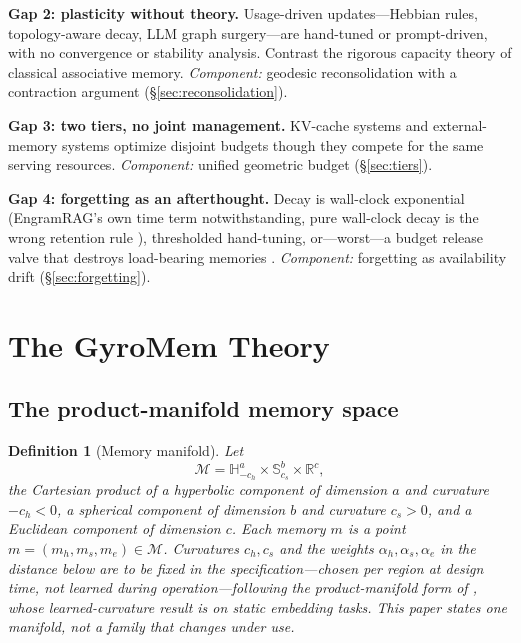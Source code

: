 \documentclass[11pt,a4paper]{article}
\newtheorem{definition}{Definition}
\newcommand{\M}{\mathcal{M}}
\newcommand{\R}{\mathbb{R}}
\newcommand{\Hyp}{\mathbb{H}}
\newcommand{\Sph}{\mathbb{S}}
\begin{document}
\textbf{Gap 2: plasticity without theory.} Usage-driven updates---Hebbian
rules, topology-aware decay, LLM graph surgery---are hand-tuned or
prompt-driven, with no convergence or stability analysis. Contrast the
rigorous capacity theory of classical associative memory. \emph{Component:}
geodesic reconsolidation with a contraction argument (\S\ref{sec:reconsolidation}).

\textbf{Gap 3: two tiers, no joint management.} KV-cache systems
\cite{actkv,agentkv} and external-memory systems \cite{jevmem,realm,jam}
optimize disjoint budgets though they compete for the same serving
resources. \emph{Component:} unified geometric budget (\S\ref{sec:tiers}).

\textbf{Gap 4: forgetting as an afterthought.} Decay is wall-clock
exponential (EngramRAG's own time term notwithstanding, pure wall-clock
decay is the wrong retention rule \cite{engramrag}), thresholded
hand-tuning, or---worst---a budget release valve that destroys load-bearing
memories \cite{epistemics}. \emph{Component:} forgetting as availability
drift (\S\ref{sec:forgetting}).

\section{The GyroMem Theory}

\subsection{The product-manifold memory space}
\label{sec:manifold}

\begin{definition}[Memory manifold]
Let
\begin{equation}
\M = \Hyp^{a}_{-c_h} \times \Sph^{b}_{c_s} \times \R^{c},
\end{equation}
the Cartesian product of a hyperbolic component of dimension $a$ and
curvature $-c_h < 0$, a spherical component of dimension $b$ and curvature
$c_s > 0$, and a Euclidean component of dimension $c$. Each memory $m$ is a
point $m = (m_h, m_s, m_e) \in \M$. Curvatures $c_h, c_s$ and the weights
$\alpha_h, \alpha_s, \alpha_e$ in the distance below are \emph{to be fixed} in
the specification---chosen per region at design time, not learned during
operation---following the product-manifold form of \cite{gu2019}, whose
learned-curvature result is on static embedding tasks. This paper states
one manifold, not a family that changes under use.
\end{definition}
\end{document}
